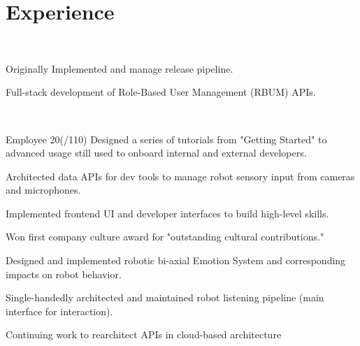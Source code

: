 \documentclass[]{csaund_resume-openfont}
\begin{document}
\hfill
\begin{minipage}[t]{0.66\textwidth}


\section{Experience}
 \\
\vspace{\topsep} %
\begin{tightemize}
\item Originally Implemented and manage release pipeline.
\item Full-stack development of Role-Based User Management (RBUM) APIs.
\end{tightemize}
\sectionsep

 \\
\begin{tightemize}
\item Employee 20(/110) Designed a series of tutorials from "Getting Started" to advanced usage still used to onboard internal and external developers.
\item Architected data APIs for dev tools to manage robot sensory input from cameras and microphones.
\item Implemented frontend UI and developer interfaces to build high-level skills.
\item Won first company culture award for "outstanding cultural contributions."
\end{tightemize}
\begin{tightemize}
\item Designed and implemented robotic bi-axial Emotion System and corresponding impacts on robot behavior.
\item Single-handedly architected and maintained robot listening pipeline (main interface for interaction).
\end{tightemize}
\begin{tightemize}
\item Continuing work to rearchitect APIs in cloud-based architecture
\end{tightemize}
\sectionsep


\end{minipage}
\end{document}
